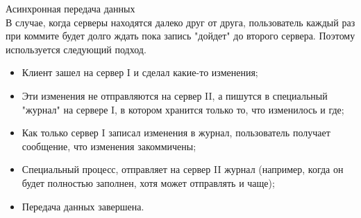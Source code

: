 Асинхронная передача данных \\
В случае, когда серверы находятся далеко друг от друга, пользователь каждый раз при коммите будет долго ждать пока запись "дойдет" до второго сервера. Поэтому используется следующий подход. 
\begin {itemize}
\item Клиент зашел на сервер I и сделал какие-то изменения;
\item Эти изменения не отправляются на сервер II, а пишутся в специальный "журнал"  на сервере I, в котором хранится только то, что изменилось и где;
\item Как только сервер I записал изменения в журнал, пользователь получает сообщение, что изменения закоммичены;
\item Специальный процесс, отправляет на сервер II журнал (например, когда он будет полностью заполнен, хотя может отправлять и чаще);
\item Передача данных завершена.
\end {itemize}
